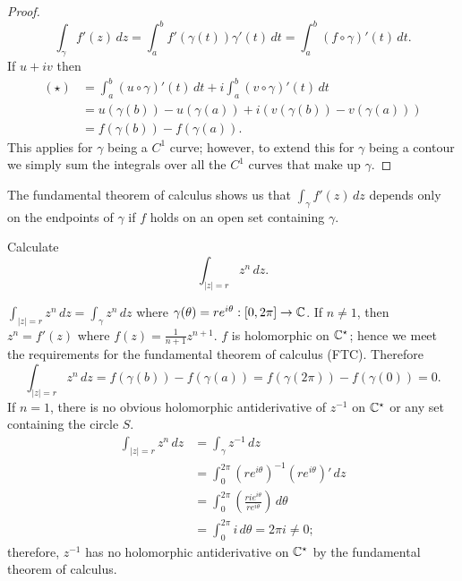 \begin{proof}
    \[ \int_\gamma f'(z) \,dz 
        = \int_a^b f'(\gamma(t)) \gamma'(t) \,dt 
        = \int_a^b (f \circ \gamma)'(t) \,dt \tag{$\star$}. \]
    If $u + iv$ then
    \begin{align*}
        (\star)
        &= \int_a^b (u \circ \gamma)'(t) \, dt + i\int_a^b (v \circ \gamma)'(t) \,dt \\
        &= u(\gamma(b)) - u(\gamma(a)) + i(v(\gamma(b)) - v(\gamma(a))) \\
        &= f(\gamma(b)) - f(\gamma(a)).
    \end{align*}
    This applies for $\gamma$ being a $C^1$ curve;
    however, to extend this for $\gamma$ being a contour
    we simply sum the integrals over all the $C^1$ curves that make up
    $\gamma$.
\end{proof}

\begin{remark}
    The fundamental theorem of calculus shows us that $\int_\gamma f'(z) \,dz$
    depends only on the endpoints of $\gamma$ if $f$ holds on an open set containing
    $\gamma$.
\end{remark}

\begin{example}
    Calculate
    \[ \int_{\lvert z \rvert = r} z^n \,dz. \]
\end{example}

\begin{solution}
    $\int_{\lvert z \rvert = r} z^n \,dz = \int_\gamma z^n \,dz$ where
    $\gamma(\theta) = re^{i\theta}: [0, 2\pi] \to \mathbb{C}$.
    If $n \neq 1$, then $z^n = f'(z)$ where $f(z) = \frac1{n+1}z^{n+1}$.
    $f$ is holomorphic on $\mathbb{C}^\star$; hence we meet the requirements
    for the fundamental theorem of calculus (FTC).
    Therefore
    \[
        \int_{\lvert z \rvert = r} z^n \, dz 
        = f(\gamma(b)) - f(\gamma(a))
        = f(\gamma(2\pi)) - f(\gamma(0))
        = 0.
    \]
    If $n = 1$, there is no obvious holomorphic antiderivative of
    $z^{-1}$ on $\mathbb{C}^\star$ or any set containing the circle $S$.
    \begin{align*}
        \int_{\lvert z \rvert = r} z^n \,dz
        &= \int_\gamma z^{-1} \,dz \\
        &= \int_0^{2\pi} \left(re^{i\theta}\right)^{-1} 
           \left(re^{i\theta}\right)' \,dz \\
        &= \int_0^{2\pi} \left(\frac{rie^{i\theta}}{re^{i\theta}}\right) \,d\theta \\
        &= \int_0^{2\pi} i \,d\theta = 2\pi i \neq 0;
    \end{align*}
    therefore, $z^{-1}$ has no holomorphic antiderivative on $\mathbb{C}^\star$ by the
    fundamental theorem of calculus.
\end{solution}
